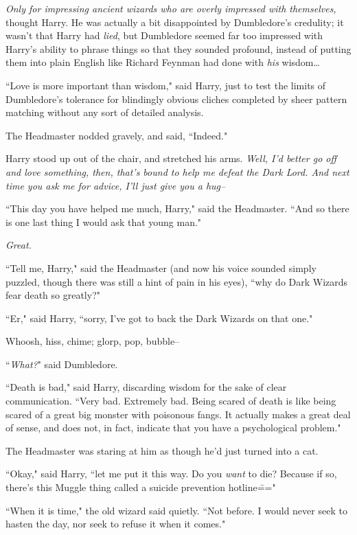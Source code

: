 \emph{Only for impressing ancient wizards who are overly impressed with themselves,} thought Harry. He was actually a bit disappointed by Dumbledore's credulity; it wasn't that Harry had \emph{lied}, but Dumbledore seemed far too impressed with Harry's ability to phrase things so that they sounded profound, instead of putting them into plain English like Richard Feynman had done with \emph{his} wisdom{\ldots}

``Love is more important than wisdom," said Harry, just to test the limits of Dumbledore's tolerance for blindingly obvious cliches completed by sheer pattern matching without any sort of detailed analysis.

The Headmaster nodded gravely, and said, ``Indeed."

Harry stood up out of the chair, and stretched his arms. \emph{Well, I'd better go off and love something, then, that's bound to help me defeat the Dark Lord. And next time you ask me for advice, I'll just give you a hug\---}

``This day you have helped me much, Harry," said the Headmaster. ``And so there is one last thing I would ask that young man."

\emph{Great.}

``Tell me, Harry," said the Headmaster (and now his voice sounded simply puzzled, though there was still a hint of pain in his eyes), ``why do Dark Wizards fear death so greatly?"

``Er," said Harry, ``sorry, I've got to back the Dark Wizards on that one."

\later

Whoosh, hiss, chime; glorp, pop, bubble\---

``\emph{What?}" said Dumbledore.

``Death is bad," said Harry, discarding wisdom for the sake of clear communication. ``Very bad. Extremely bad. Being scared of death is like being scared of a great big monster with poisonous fangs. It actually makes a great deal of sense, and does not, in fact, indicate that you have a psychological problem."

The Headmaster was staring at him as though he'd just turned into a cat.

``Okay," said Harry, ``let me put it this way. Do you \emph{want} to die? Because if so, there's this Muggle thing called a suicide prevention hotline\==="

``When it is time," the old wizard said quietly. ``Not before. I would never seek to hasten the day, nor seek to refuse it when it comes."

